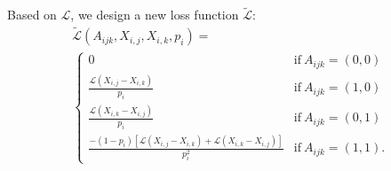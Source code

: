\documentclass{article}
\numberwithin{equation}{section}
\newcommand{\R}{\mathbb{R}}
\newtheorem{lemma}{Lemma}
\newtheorem{sampling strategy}{Sampling Strategy}
\begin{document}
Based on $\mathcal{L}$, we design a new loss function $\tilde{\mathcal{L}}$:
\begin{equation}
    \begin{aligned}
        & \tilde{\mathcal{L}}(A_{ijk}, X_{i,j}, X_{i,k}, p_i) = & \\
        & \begin{cases}
             0 & \text{if}~ A_{ijk} = (0,0) \\
             \frac{ \mathcal{L}(X_{i,j} - X_{i,k})  }{p_i} &  \text{if}~ A_{ijk} = (1,0) \\
             \frac{ \mathcal{L}(X_{i,k} - X_{i,j})  }{p_i} &  \text{if}~ A_{ijk} = (0,1) \\
             \frac{ -(1-p_i)[\mathcal{L}(X_{i,j} - X_{i,k}) + \mathcal{L}(X_{i,k} - X_{i,j})  ] }{p_i^2} &  \text{if}~ A_{ijk} = (1,1).
        \end{cases}
    \end{aligned}
    \label{eq:modifiedloss}
\end{equation}


\end{document}
